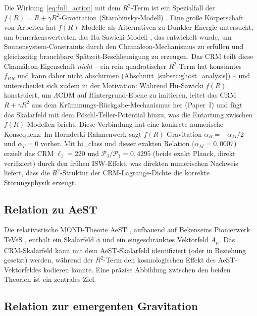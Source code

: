 \documentclass[11pt,a4paper]{article}
\begin{document}
Die Wirkung~\eqref{eq:full_action} mit dem $R^2$-Term ist ein Spezialfall der $f(R) = R + \gamma R^2$-Gravitation (Starobinsky-Modell) \cite{Starobinsky1980}. Eine gro\ss e K\"orperschaft von Arbeiten hat $f(R)$-Modelle als Alternativen zu Dunkler Energie untersucht, am bemerkenswertesten das Hu-Sawicki-Modell \cite{HuSawicki2007}, das entwickelt wurde, um Sonnensystem-Constraints durch den Cham\"aleon-Mechanismus zu erf\"ullen und gleichzeitig brauchbare Sp\"atzeit-Beschleunigung zu erzeugen. Das CRM teilt diese Cham\"aleon-Eigenschaft \textit{nicht} -- ein rein quadratischer $R^2$-Term hat konstantes $f_{RR}$ und kann daher nicht abschirmen (Abschnitt~\ref{subsec:ghost_analysis}) -- und unterscheidet sich zudem in der Motivation: W\"ahrend Hu-Sawicki $f(R)$ konstruiert, um $\Lambda$CDM auf Hintergrund-Ebene zu imitieren, leitet das CRM $R + \gamma R^2$ aus dem Kr\"ummungs-R\"uckgabe-Mechanismus her (Paper~I) und f\"ugt das Skalarfeld mit dem P\"oschl-Teller-Potential hinzu, was die Entartung zwischen $f(R)$-Modellen bricht. Diese Verbindung hat eine konkrete numerische Konsequenz: Im Horndeski-Rahmenwerk sagt $f(R)$-Gravitation $\alpha_B = -\alpha_M/2$ und $\alpha_T = 0$ vorher. Mit hi\_class \cite{Zumalacarregui2017} und dieser exakten Relation ($\alpha_M = 0{,}0007$) erzielt das CRM $\ell_1 = 220$ und $\mathcal{P}_3/\mathcal{P}_1 = 0{,}4295$ (beide exakt Planck, direkt verifiziert) durch den fr\"uhen ISW-Effekt, was direkten numerischen Nachweis liefert, dass die $R^2$-Struktur der CRM-Lagrange-Dichte die korrekte St\"orungsphysik erzeugt.

\subsection{Relation zu AeST}

Die relativistische MOND-Theorie AeST \cite{Skordis2021}, aufbauend auf Bekenseins Pionierwerk TeVeS \cite{Bekenstein2004}, enth\"alt ein Skalarfeld $\phi$ und ein eingeschr\"anktes Vektorfeld $A_\mu$. Das CRM-Skalarfeld kann mit dem AeST-Skalarfeld identifiziert (oder in Beziehung gesetzt) werden, w\"ahrend der $R^2$-Term den kosmologischen Effekt des AeST-Vektorfeldes kodieren k\"onnte. Eine pr\"azise Abbildung zwischen den beiden Theorien ist ein zentrales Ziel.

\subsection{Relation zur emergenten Gravitation}
\end{document}
